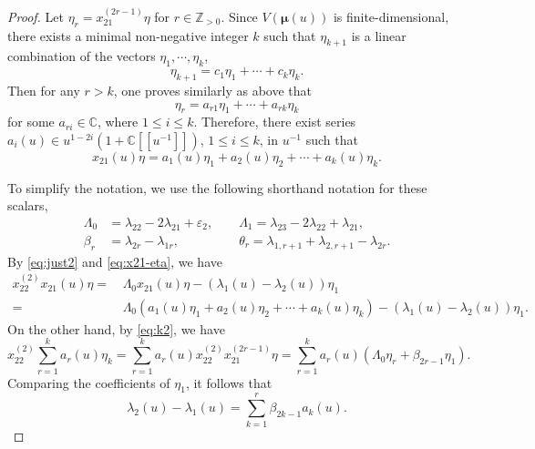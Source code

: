 \documentclass[11pt,reqno]{amsart}
\numberwithin{equation}{section}
\theoremstyle{definition}
\theoremstyle{remark}
\newcommand{\beq}{\begin{equation}}
\newcommand{\eeq}{\end{equation}}
\newcommand{\Z}{\mathbb{Z}}
\newcommand{\bC}{\mathbb{C}}
\newcommand{\lle}{\leqslant}
\newcommand{\la}{\lambda}
\newcommand{\La}{\Lambda}
\newcommand{\ve}{\varepsilon}
\begin{document}
\begin{proof}
Let $\eta_r=x_{21}^{(2r-1)}\eta$ for $r\in\Z_{>0}$. Since $V(\bm\mu(u))$ is finite-dimensional, there exists a minimal non-negative integer $k$ such that $\eta_{k+1}$ is a linear combination of the vectors $\eta_1,\cdots,\eta_k$,
\beq\label{eq:pf-low-0}
\eta_{k+1}=c_1\eta_1+\cdots+c_k\eta_k.
\eeq
Then for any $r>k$, one proves similarly as above that
\[
\eta_r=a_{r1}\eta_1+\cdots +a_{rk}\eta_k
\]
for some $a_{ri}\in \bC$, where $1\lle i\lle k$. Therefore, there exist series $a_i(u)\in u^{1-2i}(1+\bC[[u^{-1}]])$, $1\lle i\lle k$, in $u^{-1}$ such that
\beq\label{eq:x21-eta}
x_{21}(u)\eta=a_1(u)\eta_1+a_2(u)\eta_2+\cdots+a_k(u)\eta_k.
\eeq

To simplify the notation, we use the following shorthand notation for these scalars,
\begin{align*}
    \La_0&=\la_{22}-2\la_{21}+\ve_2,\qquad \La_1=\la_{23}-2\la_{22}+\la_{21},\\
    \beta_r&=\la_{2r}-\la_{1r},\qquad\qquad\ \ \  \theta_r=\la_{1,r+1}+\la_{2,r+1}-\la_{2r}.
\end{align*}
By \eqref{eq:just2} and \eqref{eq:x21-eta}, we have
\beq\label{eq:pf-low-1}
\begin{split}
    x_{22}^{(2)}x_{21}(u)\eta=&\,\La_0x_{21}(u)\eta-(\la_1(u)-\la_2(u))\eta_1\\
    =&\,\La_0(a_1(u)\eta_1+a_2(u)\eta_2+\cdots+a_k(u)\eta_k)-(\la_1(u)-\la_2(u))\eta_1.
\end{split}
\eeq
On the other hand, by \eqref{eq:k2}, we have
\beq\label{eq:pf-low-2}
    x_{22}^{(2)}\sum_{r=1}^k a_r(u)\eta_k= \sum_{r=1}^k a_r(u)x_{22}^{(2)}x_{21}^{(2r-1)}\eta   =\sum_{r=1}^k a_r(u)(\La_0\eta_r+\beta_{2r-1}\eta_1).
\eeq
Comparing the coefficients of $\eta_1$, it follows that
\beq\label{eq:pf-low-3}
\la_2(u)-\la_1(u)=\sum_{k=1}^r \beta_{2k-1}a_k(u).
\eeq


\end{proof}
\end{document}
